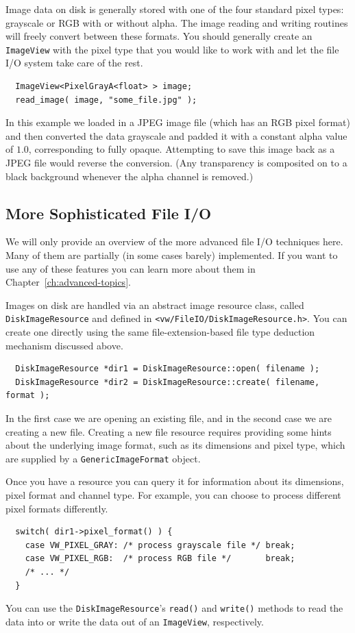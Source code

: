 Image data on disk is generally stored with one of the four standard
pixel types: grayscale or RGB with or without alpha.  The image
reading and writing routines will freely convert between these
formats.  You should generally create an \verb#ImageView# with the
pixel type that you would like to work with and let the file I/O
system take care of the rest.
\begin{verbatim}
  ImageView<PixelGrayA<float> > image;
  read_image( image, "some_file.jpg" );
\end{verbatim}
In this example we loaded in a JPEG image file (which has an RGB pixel
format) and then converted the data grayscale and padded it with a
constant alpha value of $1.0$, corresponding to fully opaque.  
Attempting to save this image back as a JPEG file would reverse the 
conversion.  (Any transparency is composited on to a black background 
whenever the alpha channel is removed.)

\subsection{More Sophisticated File I/O}

We will only provide an overview of the more advanced file I/O 
techniques here.  Many of them are partially (in some cases barely) 
implemented.  If you want to use any of these features you can 
learn more about them in Chapter~\ref{ch:advanced-topics}.

Images on disk are handled via an abstract image resource
class, called \verb#DiskImageResource# and defined in
\verb#<vw/FileIO/DiskImageResource.h>#.  You can create one directly 
using the same file-extension-based file type deduction mechanism 
discussed above.
\begin{verbatim}
  DiskImageResource *dir1 = DiskImageResource::open( filename );
  DiskImageResource *dir2 = DiskImageResource::create( filename, format );
\end{verbatim}
In the first case we are opening an existing file, and in the second 
case we are creating a new file.  Creating a new file resource requires 
providing some hints about the underlying image format, such as its 
dimensions and pixel type, which are supplied by a \verb#GenericImageFormat# 
object.

Once you have a resource you can query it for information about its 
dimensions, pixel format and channel type.  For example, you can choose 
to process different pixel formats differently.
\begin{verbatim}
  switch( dir1->pixel_format() ) {
    case VW_PIXEL_GRAY: /* process grayscale file */ break;
    case VW_PIXEL_RGB:  /* process RGB file */       break;
    /* ... */
  }
\end{verbatim}
You can use the \verb#DiskImageResource#'s \verb#read()# and \verb#write()# 
methods to read the data into or write the data out of an \verb#ImageView#, 
respectively.


